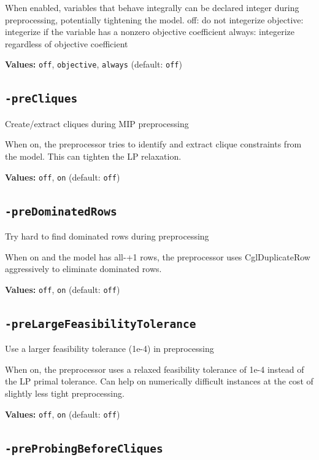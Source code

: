 \documentclass[11pt,a4paper]{article}
\begin{document}
When enabled, variables that behave integrally can be declared integer during preprocessing, potentially tightening the model.
  off: do not integerize
  objective: integerize if the variable has a nonzero objective coefficient
  always: integerize regardless of objective coefficient

\textbf{Values:} \texttt{off}, \texttt{objective}, \texttt{always} (default: \texttt{off})

\subsection*{\texttt{-preCliques}}

Create/extract cliques during MIP preprocessing

When on, the preprocessor tries to identify and extract clique constraints from the model. This can tighten the LP relaxation.

\textbf{Values:} \texttt{off}, \texttt{on} (default: \texttt{off})

\subsection*{\texttt{-preDominatedRows}}

Try hard to find dominated rows during preprocessing

When on and the model has all-+1 rows, the preprocessor uses CglDuplicateRow aggressively to eliminate dominated rows.

\textbf{Values:} \texttt{off}, \texttt{on} (default: \texttt{off})

\subsection*{\texttt{-preLargeFeasibilityTolerance}}

Use a larger feasibility tolerance (1e-4) in preprocessing

When on, the preprocessor uses a relaxed feasibility tolerance of 1e-4 instead of the LP primal tolerance. Can help on numerically difficult instances at the cost of slightly less tight preprocessing.

\textbf{Values:} \texttt{off}, \texttt{on} (default: \texttt{off})

\subsection*{\texttt{-preProbingBeforeCliques}}
\end{document}
